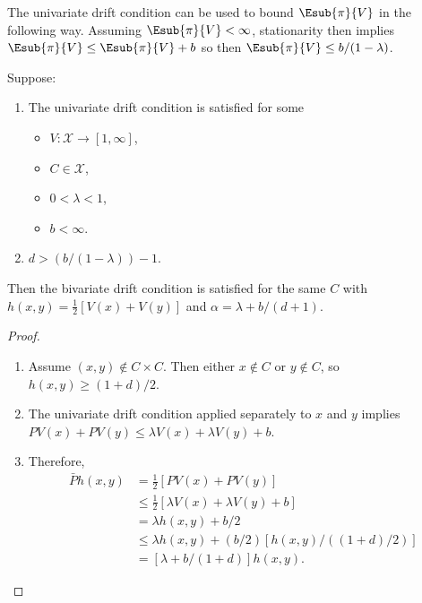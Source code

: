 \documentclass[12pt]{article}
\begin{document}
The univariate drift condition can be used to bound \( \Esub{\pi}{V} \)
in the following way.  Assuming \( \Esub{\pi}{V} < \infty \),
stationarity then implies \( \Esub{\pi}{V} \le \Esub{\pi}{V} + b \) so
then \( \Esub{\pi}{V} \le b/(1-\lambda) \).

\begin{proposition}
    Suppose:
    \begin{enumerate}
        \item
            The univariate drift condition is satisfied for some
            \begin{itemize}
                \item
                    \( V :  \mathcal{X} \to [1,\infty] \),
                \item
                    \( C \in \mathcal{X} \),
                \item
                    \( 0 < \lambda < 1 \),
                \item
                    \( b < \infty \).
            \end{itemize}
        \item
            \( d > ( b/(1-\lambda)) - 1 \).
    \end{enumerate}
    Then the bivariate drift condition is satisfied for the same \( C \)
    with \( h(x,y) = \frac{1}{2}[ V(x) + V(y)] \) and \( \alpha =
    \lambda + b/(d + 1) \).
\end{proposition}

\begin{proof}
    \begin{enumerate}
        \item
            Assume \( (x,y) \notin C \times C \).  Then either \( x
            \notin C \) or \( y \notin C \), so \( h(x,y) \ge (1 + d)/2 \).
        \item
            The univariate drift condition applied separately to \( x \)
            and \( y \) implies \( PV(x) + PV(y) \le \lambda V(x) +
            \lambda V(y) + b \).
        \item
            Therefore,
            \begin{align*}
                \bar{P}h(x,y) &= \frac{1}{2} \left[ PV(x) + PV(y) \right]
                \\
                &\le \frac{1}{2} \left[ \lambda V(x) + \lambda V(y) + b
                \right] \\
                &= \lambda h(x,y) + b/2 \\
                &\le \lambda h(x,y) + (b/2) \left[ h(x,y)/((1+d)/2)
                \right] \\
                &= \left[ \lambda + b/(1+d) \right] h(x,y).
            \end{align*}
    \end{enumerate}
\end{proof}
\end{document}
